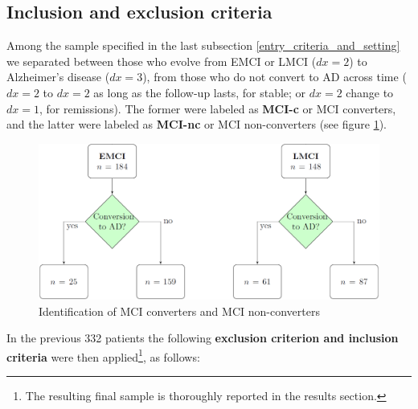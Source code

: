 \documentclass[a4paper,12pt]{elsarticle}  %
\begin{document}
	\subsection{Inclusion and exclusion criteria} \label{sec:inclusion_exclusion_criteria}
	
	Among the sample specified in the last subsection \ref{entry_criteria_and_setting} we separated between those who evolve from EMCI or LMCI ($dx=2$) to Alzheimer's disease ($dx=3$), from those who do not convert to AD across time ($dx=2$ to $dx=2$ as long as the follow-up lasts, for stable; or $dx=2$ change to $dx=1$, for remissions). The former were labeled as \textbf{MCI-c} or MCI converters, and the latter were labeled as \textbf{MCI-nc} or MCI non-converters (see figure \ref{fig:conv_no_conv}).
	
	\begin{figure}[h]
		\centering
		\includegraphics[width=\textwidth]{fig_conv_no_conv.png}
		\caption{Identification of MCI converters and MCI non-converters}
		\label{fig:conv_no_conv}
	\end{figure}
	\FloatBarrier
		
		
	In the previous 332 patients the following \textbf{exclusion criterion and inclusion criteria} were then applied\footnote{The resulting final sample is  thoroughly reported in the results section.}, as follows:	
	
\end{document}
